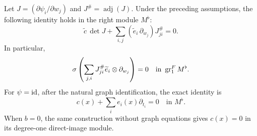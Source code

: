 \begin{lemma}\label{lem:local-symbol}
Let \(J=(\partial\psi_i/\partial w_j)\) and
\(J^\#=\operatorname{adj}(J)\).  Under the preceding assumptions, the
following identity holds in the right module \(M^\flat\):
\begin{equation}\label{eq:adjugate-operator}
 \widetilde c\,\det J+
 \sum_{i,j}(\widetilde e_i\,\partial_{w_j})J^\#_{ji}=0.
\end{equation}
In particular,
\begin{equation}\label{eq:local-symbol-zero}
 \sigma\left(\sum_{j,i}J^\#_{ji}\widetilde e_i\otimes\partial_{w_j}\right)=0
 \quad\text{in }\operatorname{gr}^F_1M^\flat.
\end{equation}
For \(\psi=\mathrm{id}\), after the natural graph identification, the exact
identity is
\begin{equation}\label{eq:identity-operator}
 c(x)+\sum_i e_i(x)\partial_{t_i}=0\quad\text{in }M^\flat.
\end{equation}
When \(b=0\), the same construction without graph equations gives
\(c(x)=0\) in its degree-one direct-image module.
\end{lemma}
